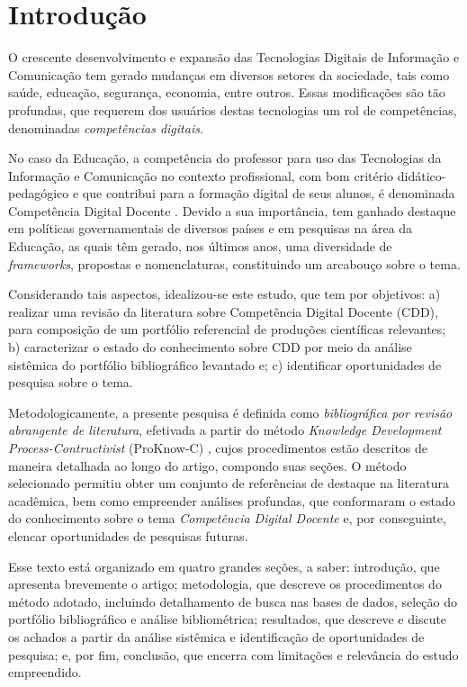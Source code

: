 \documentclass[portuguese]{textolivre}
\begin{document}
\section{Introdução}

O crescente desenvolvimento e expansão das Tecnologias Digitais de Informação e Comunicação tem gerado mudanças em diversos setores da sociedade, tais como saúde, educação, segurança, economia, entre outros. Essas modificações são tão profundas, que requerem dos usuários destas tecnologias um rol de competências, denominadas \textit{competências digitais}.

No caso da Educação, a competência do professor para uso das Tecnologias da Informação e Comunicação no contexto profissional, com bom critério didático-pedagógico e que contribui para a formação digital de seus alunos, é denominada Competência Digital Docente \cite{espinosa__competencia_2018,pettersson_issues_2018,spante_digital_2018}. Devido a sua importância, tem ganhado destaque em políticas governamentais de diversos países e em pesquisas na área da Educação, as quais têm gerado, nos últimos anos, uma diversidade de \textit{frameworks}, propostas e nomenclaturas, constituindo um arcabouço sobre o tema.

Considerando tais aspectos, idealizou-se este estudo, que tem por objetivos: 
a) realizar uma revisão da literatura sobre Competência Digital Docente (CDD), para composição de um portfólio referencial de produções científicas relevantes;
b) caracterizar o estado do conhecimento sobre CDD por meio da análise sistêmica do portfólio bibliográfico levantado e; 
c) identificar oportunidades de pesquisa sobre o tema.

Metodologicamente, a presente pesquisa é definida como \textit{bibliográfica por revisão abrangente de literatura}, efetivada a partir do método \textit{Knowledge Development Process-Contructivist} (ProKnow-C) \cite{ensslin_proknow-c_2010}, cujos procedimentos estão descritos de maneira detalhada ao longo do artigo, compondo suas seções. O método selecionado permitiu obter um conjunto de referências de destaque na literatura acadêmica, bem como empreender análises profundas, que conformaram o estado do conhecimento sobre o tema \textit{Competência Digital Docente} e, por conseguinte, elencar oportunidades de pesquisas futuras.

Esse texto está organizado em quatro grandes seções, a saber: introdução, que apresenta brevemente o artigo; metodologia, que descreve os procedimentos do método adotado, incluindo detalhamento de busca nas bases de dados, seleção do portfólio bibliográfico e análise bibliométrica; resultados, que descreve e discute os achados a partir da análise sistêmica e identificação de oportunidades de pesquisa; e, por fim, conclusão, que encerra com limitações e relevância do estudo empreendido. 
\end{document}
